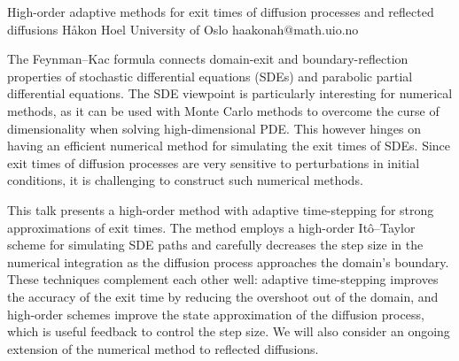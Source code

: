 \begin{talk}
  {High-order adaptive methods for exit times of diffusion processes and reflected diffusions}%
  {H{\aa}kon Hoel}%
  {University of Oslo}%
  {haakonah@math.uio.no}%
  {}%
  
    
   
\medskip
The Feynman--Kac formula connects domain-exit and boundary-reflection properties of stochastic differential equations (SDEs) and parabolic partial differential equations. The SDE viewpoint is particularly interesting for numerical methods, as it can be used with Monte Carlo methods to overcome the curse of dimensionality when solving high-dimensional PDE. This however hinges on having an efficient numerical method for simulating the exit times of SDEs. Since exit times of diffusion processes are very sensitive to perturbations in initial conditions, it is challenging to construct such numerical methods.

This talk presents a high-order method with adaptive time-stepping for strong approximations of exit times. The method employs a high-order It\^o--Taylor scheme for simulating SDE paths and carefully decreases the step size in the numerical integration as the diffusion process approaches the domain's boundary. These techniques complement each other well: adaptive time-stepping improves the accuracy of the exit time by reducing the overshoot out of the domain, and high-order schemes improve the state approximation of the diffusion process, which is useful feedback to control the step size. We will also consider an ongoing extension of the numerical method to reflected diffusions.

\end{talk}

